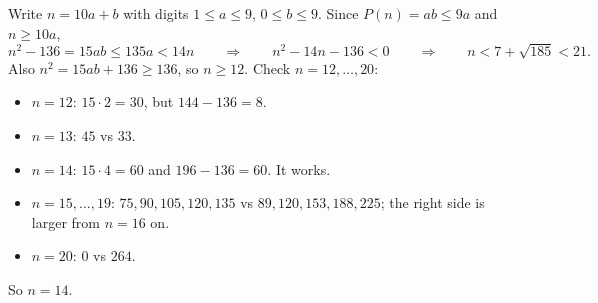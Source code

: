 Write $n=10a+b$ with digits $1\le a\le9$, $0\le b\le9$. Since $P(n)=ab\le9a$ and $n\ge10a$,
\[
n^2-136=15ab\le135a<14n\qquad\Longrightarrow\qquad n^2-14n-136<0\qquad\Longrightarrow\qquad n<7+\sqrt{185}<21 .
\]
Also $n^2=15ab+136\ge136$, so $n\ge12$. Check $n=12,\dots,20$:
\begin{itemize}
\item $n=12$: $15\cdot2=30$, but $144-136=8$.
\item $n=13$: $45$ vs $33$.
\item $n=14$: $15\cdot4=60$ and $196-136=60$. It works.
\item $n=15,\dots,19$: $75,90,105,120,135$ vs $89,120,153,188,225$; the right side is larger from $n=16$ on.
\item $n=20$: $0$ vs $264$.
\end{itemize}
So $n=\boxed{14}$.
